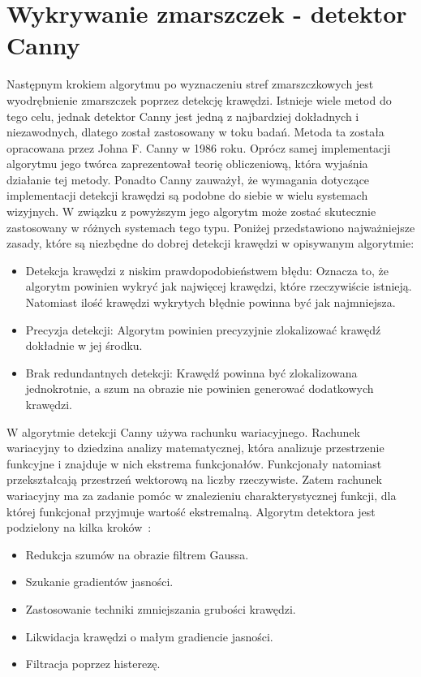 \documentclass[a4paper,twoside,12pt]{book}
\begin{document}
    \section{Wykrywanie zmarszczek - detektor Canny}\label{sec:wykrywanie-zmarszczek---detektor-canny}
    Następnym krokiem algorytmu po wyznaczeniu stref zmarszczkowych jest wyodrębnienie zmarszczek poprzez detekcję
    krawędzi.
    Istnieje wiele metod do tego celu,
    jednak detektor Canny jest jedną z najbardziej dokładnych i niezawodnych, dlatego został zastosowany w toku badań.
    Metoda ta została opracowana przez Johna F. Canny w 1986 roku.
    Oprócz samej implementacji algorytmu jego twórca zaprezentował teorię obliczeniową,
    która wyjaśnia działanie tej metody. Ponadto Canny zauważył,
    że wymagania dotyczące implementacji detekcji krawędzi są podobne do siebie w wielu systemach wizyjnych.
    W związku z powyższym jego algorytm może zostać skutecznie zastosowany w różnych systemach tego typu.
    Poniżej przedstawiono najważniejsze zasady,
    które są niezbędne do dobrej detekcji krawędzi w opisywanym algorytmie:
    \begin{itemize}
        \item Detekcja krawędzi z niskim prawdopodobieństwem błędu:
        Oznacza to, że algorytm powinien wykryć jak najwięcej krawędzi, które rzeczywiście istnieją.
        Natomiast ilość krawędzi wykrytych błędnie powinna być jak najmniejsza.
        \item Precyzja detekcji: Algorytm powinien precyzyjnie zlokalizować krawędź dokładnie w jej środku.
        \item Brak redundantnych detekcji:
        Krawędź powinna być zlokalizowana jednokrotnie,
        a szum na obrazie nie powinien generować dodatkowych krawędzi.
    \end{itemize}
    W algorytmie detekcji Canny używa rachunku wariacyjnego.
    Rachunek wariacyjny to dziedzina analizy matematycznej, która
    analizuje przestrzenie funkcyjne i znajduje w nich ekstrema funkcjonałów.
    Funkcjonały natomiast przekształcają przestrzeń wektorową na liczby rzeczywiste.
    Zatem rachunek wariacyjny ma za zadanie pomóc w znalezieniu charakterystycznej funkcji,
    dla której funkcjonał przyjmuje wartość ekstremalną.
    Algorytm detektora jest podzielony na kilka kroków~\cite{Canny}:
    \begin{itemize}
        \item Redukcja szumów na obrazie filtrem Gaussa.
        \item Szukanie gradientów jasności.
        \item Zastosowanie techniki zmniejszania grubości krawędzi.
        \item Likwidacja krawędzi o małym gradiencie jasności.
        \item Filtracja poprzez histerezę.
    \end{itemize}
\end{document}
